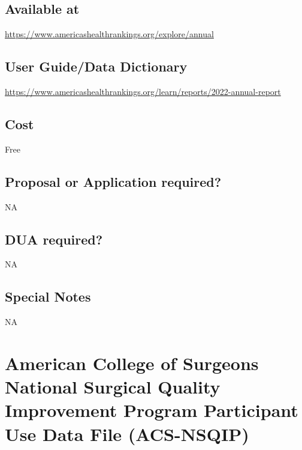 \documentclass[
]{book}
\begin{document}
\hypertarget{available-at-1}{%
\section{Available at}\label{available-at-1}}

\url{https://www.americashealthrankings.org/explore/annual}

\hypertarget{user-guidedata-dictionary-1}{%
\section{User Guide/Data Dictionary}\label{user-guidedata-dictionary-1}}

\url{https://www.americashealthrankings.org/learn/reports/2022-annual-report}

\hypertarget{cost-1}{%
\section{Cost}\label{cost-1}}

Free

\hypertarget{proposal-or-application-required-1}{%
\section{Proposal or Application required?}\label{proposal-or-application-required-1}}

NA

\hypertarget{dua-required-1}{%
\section{DUA required?}\label{dua-required-1}}

NA

\hypertarget{special-notes-1}{%
\section{Special Notes}\label{special-notes-1}}

NA

\mainmatter

\hypertarget{american-college-of-surgeons-national-surgical-quality-improvement-program-participant-use-data-file-acs-nsqip}{%
\chapter{American College of Surgeons National Surgical Quality Improvement Program Participant Use Data File (ACS-NSQIP)}\label{american-college-of-surgeons-national-surgical-quality-improvement-program-participant-use-data-file-acs-nsqip}}
\end{document}
